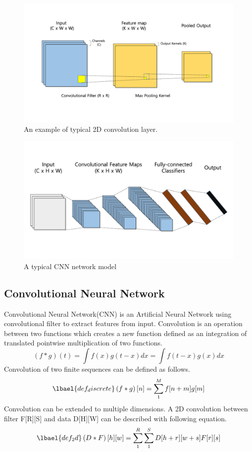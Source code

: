 \begin{figure}
  \centering
  \includegraphics[width=\linewidth]{./figures/conv_2dlayer}
  \caption{An example of typical 2D convolution layer. }
  \label{fig_convlayer}
\end{figure}
\begin{figure}
  \centering
  \includegraphics[width=\linewidth]{./figures/conv_model}
  \caption{A typical CNN network model }
  \label{fig_convmodel}
\end{figure}

\subsection{Convolutional Neural Network}
Convolutional Neural Network(CNN) is an Artificial Neural Network using convolutional filter to extract features from input.
Convolution is an operation between two functions which creates a new function defined as an integration of translated pointwise multiplication of two functions.
\begin{equation}
\left ( f * g \right )(t) = \int f(x)g(t-x)dx = \int f(t-x)g(x)dx
\label{def_convolution}
\end{equation}
Convolution of two finite sequences can be defined as follows.
\begin{equation}
\lbael{def_discrete}
\left ( f * g \right )[n] = \sum_{1}^{M} f[n + m]g[m]
\end{equation}
Convolution can be extended to multiple dimensions.
A 2D convolution between filter F[R][S] and data D[H][W] can be described with following equation.
\begin{equation}
\lbael{def_2d}
\left ( D * F \right )[h][w] = \sum_{1}^{R}\sum_{1}^{S} D[h + r][w + s] F[r][s]
\end{equation}

